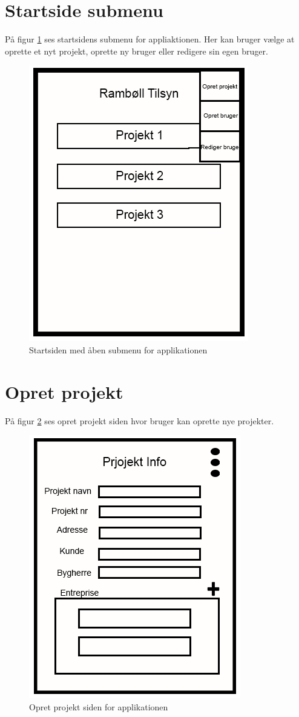 \section{Startside submenu}\label{sec:StartSubMock}
På figur \ref{fig:StartSubMock} ses startsidens submenu for appliaktionen. Her kan bruger vælge at oprette et nyt projekt, oprette ny bruger eller redigere sin egen bruger.

\begin{figure}[H]
	\centering
	\includegraphics[width=0.4\linewidth]{MockUps/Mock/Ramboell-Startside-Sub}
	\caption{Startsiden med åben submenu for applikationen}
	\label{fig:StartSubMock}
\end{figure}

\clearpage

\section{Opret projekt}\label{sec:OpretProjektMock}
På figur \ref{fig:OpretProjektMock} ses opret projekt siden hvor bruger kan oprette nye projekter.

\begin{figure}[H]
	\centering
	\includegraphics[width=0.4\linewidth]{MockUps/Mock/Ramboell-ProjektInfo}
	\caption{Opret projekt siden for applikationen}
	\label{fig:OpretProjektMock}
\end{figure}

